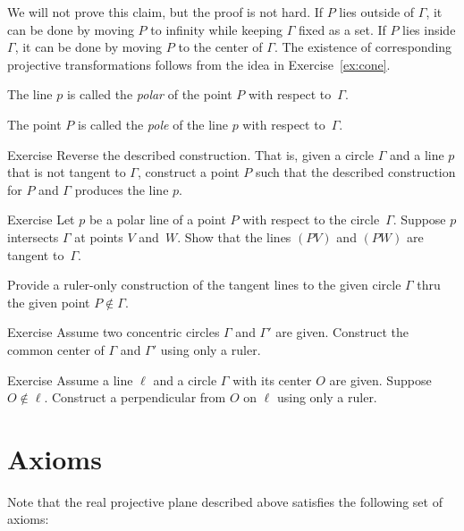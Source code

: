 We will not prove this claim, but the proof is not hard.
If $P$ lies outside of $\Gamma$, it can be done by moving $P$ to infinity while keeping $\Gamma$ fixed as a set.
If $P$ lies inside $\Gamma$, it can be done by moving $P$ to the center of $\Gamma$.
The existence of corresponding projective transformations follows from the idea in Exercise~\ref{ex:cone}.

The line $p$ is called the \emph{polar} of the point $P$ with respect to~$\Gamma$.

The point $P$ is called the \emph{pole} of the line $p$ with respect to~$\Gamma$.

\begin{thm}{Exercise}\label{ex:revert}
Reverse the described construction.
That is, given a circle $\Gamma$ and a line $p$ that is not tangent to $\Gamma$, construct a point $P$ such that the described construction for $P$ and $\Gamma$ produces the line $p$.
\end{thm}

\begin{thm}{Exercise}\label{ex:tangent ruler}
Let $p$ be a polar line of a point $P$ with respect to the circle~$\Gamma$.
Suppose $p$ intersects $\Gamma$ at points $V$ and~$W$.
Show that the lines $(PV)$ and $(PW)$ are tangent to~$\Gamma$.

Provide a ruler-only construction of the tangent lines to the given circle $\Gamma$ thru the given point $P\notin\Gamma$.
\end{thm}

\begin{thm}{Exercise}\label{ex:concentric-circ}
Assume two concentric circles $\Gamma$ and $\Gamma'$ are given.
Construct the common center of $\Gamma$ and $\Gamma'$ using only a ruler.
\end{thm}

\begin{thm}{Exercise}\label{ex:proj-perp}
Assume a line $\ell$ and a circle $\Gamma$ with its center $O$ are given.
Suppose $O\notin \ell$.
Construct a perpendicular from $O$ on $\ell$ using only a ruler.
\end{thm}

\section{Axioms}

Note that the real projective plane described above satisfies the following set of axioms:

